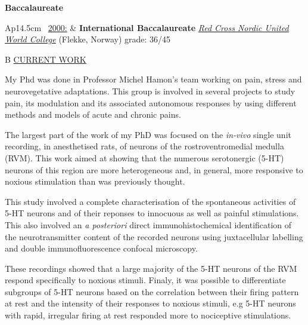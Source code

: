 \documentclass[a4paper,12pt,oneside]{letter}
\begin{document}
{\begin{center}
\Large\textbf{Baccalaureate}
\end{center}

\begin{tabular}{Ap{14.5cm}}
\textbullet~\underline{2000:} & \large\textbf{International Baccalaureate} \newline
				\normalsize \href{http://www.rcnuwc.no/}{\textit{Red Cross Nordic United World College}} (Flekke, Norway) \newline
grade: 36/45 \\
\end{tabular}


\begin{tabular}{B}
\underline{CURRENT WORK}
\end{tabular}

My Phd was done in Professor Michel Hamon's team working on pain, stress and neurovegetative adaptations. This group is involved in several projects to study pain, its modulation and its associated autonomous responses by using different methods and models of acute and chronic pains. 

The largest part of the work of my PhD was focused on the \textit{in-vivo} single unit recording, in anesthetised rats, of neurons of the rostroventromedial medulla (RVM).
This work aimed at showing that the numerous serotonergic (5-HT) neurons of this region are more heterogeneous and, in general, more responsive to noxious stimulation than was previously thought. 

This study involved a complete characterisation of the spontaneous activities of 5-HT neurons and of their reponses to innocuous as well as painful
stimulations. This also involved an \textit{a posteriori} direct immunohistochemical identification of the neurotransmitter content of the recorded neurons using juxtacellular labelling and double immunofluorescence confocal microscopy. 

These recordings showed that a large majority of the 5-HT neurons of the RVM 
respond specifically to noxious stimuli. 
Finaly, it was possible to differentiate subgroups of 5-HT neurons based on the correlation between their firing pattern at rest and the intensity of their responses to noxious stimuli, e.g 5-HT neurons with rapid, irregular firing at rest responded more to nociceptive stimulations.

}
\end{document}

